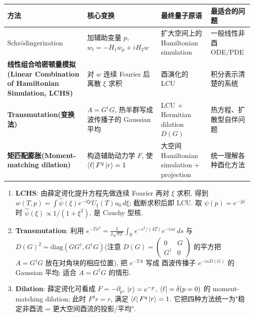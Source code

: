 \documentclass[utf8]{article} %
\numberwithin{equation}{section}   %
\newtheorem{Note}{\hskip 2em {\color{red} 注}}[subsection]
\begin{document}
\begin{center}
\begin{tabular}{@{}>{\raggedright\arraybackslash}p{4.1cm}>{\raggedright\arraybackslash}p{4.7cm}>{\raggedright\arraybackslash}p{3.0cm}>{\raggedright\arraybackslash}p{2.4cm}@{}}
    \toprule
    方法 & 核心变换 & 最终量子原语 & 最适合的问题 \\
    \midrule
    Schr\"odingerization & 加辅助变量 $p$, $w_t = -H_1 w_p + iH_2 w$ &
    扩大空间上的 Hamiltonian simulation &
    一般线性非酉 ODE/PDE \\
    \textbf{线性组合哈密顿量模拟(Linear Combination of Hamiltonian Simulation, LCHS)} & 对 $w$ 连续 Fourier 后离散 $\xi$ 求积 &
    酉演化的 LCU &
    积分表示清楚的系统 \\
    \textbf{Transmutation(变换法)} & $A = G^\dagger G$, 热半群写成波传播子的 Gaussian 平均 &
    LCU + Hermitian dilation $D(G)$ &
    热方程、扩散型自伴问题 \\
    \textbf{矩匹配膨胀(Moment-matching dilation)} & 构造辅助动力学 $F$, 使 $\bra{\ell}F^q\ket{r} = 1$ &
    大空间 Hamiltonian simulation + projection &
    统一理解各种酉化方法 \\
    \bottomrule
\end{tabular}
\end{center}

\begin{Note}[四种方法的联系]
    \begin{enumerate}
        \item \textbf{LCHS}: 由薛定谔化提升方程先做连续 Fourier 再对 $\xi$ 求积,
        得到 $w(T,p) = \int \hat\psi(\xi)e^{-i\xi p}U_\xi(T)u_0\,d\xi$;
        截断求积后即 LCU. 取 $\psi(p) = e^{-|p|}$ 时
        $\hat\psi(\xi) \propto 1/(1+\xi^2)$, 是 Cauchy 型核.
        \item \textbf{Transmutation}: 利用
        $e^{-Tx^2} = \frac{1}{2\sqrt{\pi T}}\int_{\mathbb{R}} e^{-s^2/(4T)}e^{-isx}\,ds$
        与 $D(G)^2 = \mathrm{diag}(GG^\dagger, G^\dagger G)$(注意 $D(G) = \begin{pmatrix}0&G\\G^\dagger&0\end{pmatrix}$
        的平方把 $A = G^\dagger G$ 放在对角块的相应位置), 把 $e^{-TA}$ 写成
        酉波传播子 $e^{-isD(G)}$ 的 Gaussian 平均; 适合 $A = G^\dagger G$ 的情形.
        \item \textbf{Dilation}: 薛定谔化可看成
        $F = -\partial_p$, $\ket{r} = e^{-p}$, $\bra{\ell} = \delta(p=0)$
        的 moment-matching dilation; 此时 $F^q r = r$, 满足 $\bra{\ell}F^q\ket{r}=1$.
        它把四种方法统一为"稳定非酉流 = 更大空间酉流的投影/平均".
    \end{enumerate}
\end{Note}
\end{document}
